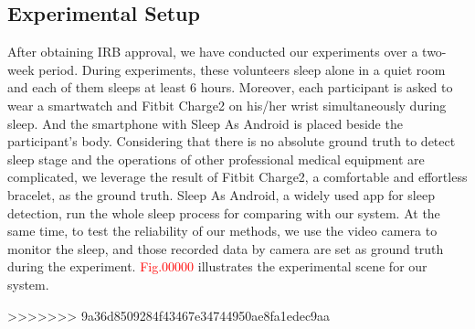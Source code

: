 \subsection{Experimental Setup}
After obtaining IRB approval, we have conducted our experiments over a two-week period. During experiments, these volunteers sleep alone in
a quiet room and each of them sleeps at least 6 hours. Moreover, each participant is asked to wear a smartwatch and Fitbit Charge2
\cite{fitbit} on his/her wrist simultaneously during sleep. And the smartphone with Sleep As Android \cite{SleepAndroid} is placed beside
the participant's body. Considering that there is no absolute ground truth to detect sleep stage and the operations of other professional
medical equipment are complicated, we leverage the result of Fitbit Charge2, a comfortable and effortless bracelet, as the ground truth.
Sleep As Android, a widely used app for sleep detection, run the whole sleep process for comparing with our system. At the same time, to
test the reliability of our methods, we use the video camera to monitor the sleep, and those recorded data by camera are set as ground
truth during the experiment. \textcolor{red}{Fig.00000} illustrates the experimental scene for our system.

>>>>>>> 9a36d8509284f43467e34744950ae8fa1edec9aa
